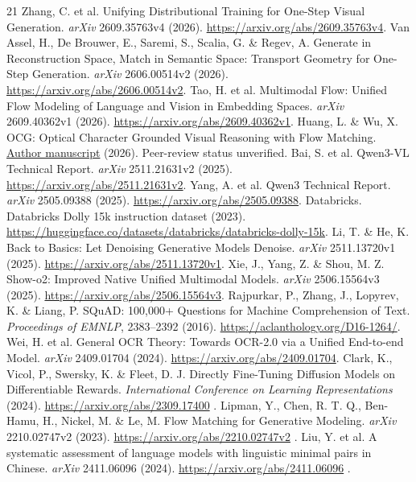 \documentclass[12pt,a4paper]{article}
\providecommand{\DIFadd}[1]{{\protect\color{blue} \sf #1}} %
\providecommand{\DIFaddbegin}{} %
\begin{document}
\begin{thebibliography}{21}
 Zhang, C. et al. Unifying Distributional Training for One-Step Visual Generation. \emph{arXiv} 2609.35763v4 (2026). \url{https://arxiv.org/abs/2609.35763v4}.
 Van Assel, H., De Brouwer, E., Saremi, S., Scalia, G. \& Regev, A. Generate in Reconstruction Space, Match in Semantic Space: Transport Geometry for One-Step Generation. \emph{arXiv} 2606.00514v2 (2026). \url{https://arxiv.org/abs/2606.00514v2}.
 Tao, H. et al. Multimodal Flow: Unified Flow Modeling of Language and Vision in Embedding Spaces. \emph{arXiv} 2609.40362v1 (2026). \url{https://arxiv.org/abs/2609.40362v1}.
 Huang, L. \& Wu, X. OCG: Optical Character Grounded Visual Reasoning with Flow Matching. \href{https://www.alphaxiv.org/abs/2608.ocg-optical-character-grounded-reasoning}{Author manuscript} (2026). Peer-review status unverified.
 Bai, S. et al. Qwen3-VL Technical Report. \emph{arXiv} 2511.21631v2 (2025). \url{https://arxiv.org/abs/2511.21631v2}.
 Yang, A. et al. Qwen3 Technical Report. \emph{arXiv} 2505.09388 (2025). \url{https://arxiv.org/abs/2505.09388}.
 Databricks. Databricks Dolly 15k instruction dataset (2023). \url{https://huggingface.co/datasets/databricks/databricks-dolly-15k}.
 Li, T. \& He, K. Back to Basics: Let Denoising Generative Models Denoise. \emph{arXiv} 2511.13720v1 (2025). \url{https://arxiv.org/abs/2511.13720v1}.
 Xie, J., Yang, Z. \& Shou, M. Z. Show-o2: Improved Native Unified Multimodal Models. \emph{arXiv} 2506.15564v3 (2025). \url{https://arxiv.org/abs/2506.15564v3}.
 Rajpurkar, P., Zhang, J., Lopyrev, K. \& Liang, P. SQuAD: 100,000+ Questions for Machine Comprehension of Text. \emph{Proceedings of EMNLP}, 2383--2392 (2016). \url{https://aclanthology.org/D16-1264/}.
 Wei, H. et al. General OCR Theory: Towards OCR-2.0 via a Unified End-to-end Model. \emph{arXiv} 2409.01704 (2024). \url{https://arxiv.org/abs/2409.01704}.
 Clark, K., Vicol, P., Swersky, K. \& Fleet, D. J. Directly Fine-Tuning Diffusion Models on Differentiable Rewards. \emph{International Conference on Learning Representations} (2024). \url{https://arxiv.org/abs/2309.17400}\DIFaddbegin \DIFadd{.
} \DIFadd{Lipman, Y., Chen, R. T. Q., Ben-Hamu, H., Nickel, M. \& Le, M. Flow Matching for Generative Modeling. \emph{arXiv} 2210.02747v2 (2023). }\url{https://arxiv.org/abs/2210.02747v2}\DIFadd{.
} \DIFadd{Liu, Y. et al. A systematic assessment of language models with linguistic minimal pairs in Chinese. \emph{arXiv} 2411.06096 (2024). }\url{https://arxiv.org/abs/2411.06096}\DIFadd{.
}
\end{thebibliography}
\end{document}
